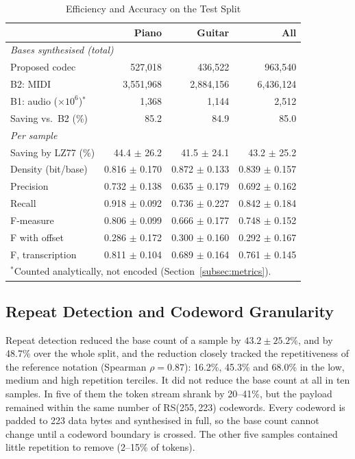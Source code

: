 \documentclass[conference]{IEEEtran}
\begin{document}
\begin{table}[htbp]
\caption{Efficiency and Accuracy on the Test Split}
\label{tab:results}
\centering
\footnotesize
\setlength{\tabcolsep}{3pt}
\begin{tabular}{lrrr}
\hline
 & \textbf{Piano} & \textbf{Guitar} & \textbf{All} \\
\hline
\multicolumn{4}{l}{\textit{Bases synthesised (total)}} \\
Proposed codec & 527,018 & 436,522 & 963,540 \\
B2: MIDI & 3,551,968 & 2,884,156 & 6,436,124 \\
B1: audio ($\times 10^{6}$)$^{*}$ & 1,368 & 1,144 & 2,512 \\
Saving vs.\ B2 (\%) & 85.2 & 84.9 & 85.0 \\
\multicolumn{4}{l}{\textit{Per sample}} \\
Saving by LZ77 (\%) & 44.4 $\pm$ 26.2 & 41.5 $\pm$ 24.1 & 43.2 $\pm$ 25.2 \\
Density (bit/base) & 0.816 $\pm$ 0.170 & 0.872 $\pm$ 0.133 & 0.839 $\pm$ 0.157 \\
Precision & 0.732 $\pm$ 0.138 & 0.635 $\pm$ 0.179 & 0.692 $\pm$ 0.162 \\
Recall & 0.918 $\pm$ 0.092 & 0.736 $\pm$ 0.227 & 0.842 $\pm$ 0.184 \\
F-measure & 0.806 $\pm$ 0.099 & 0.666 $\pm$ 0.177 & 0.748 $\pm$ 0.152 \\
F with offset & 0.286 $\pm$ 0.172 & 0.300 $\pm$ 0.160 & 0.292 $\pm$ 0.167 \\
F, transcription & 0.811 $\pm$ 0.104 & 0.689 $\pm$ 0.164 & 0.761 $\pm$ 0.145 \\
\hline
\multicolumn{4}{l}{$^{*}$Counted analytically, not encoded (Section~\ref{subsec:metrics}).} \\
\end{tabular}
\end{table}

\subsection{Repeat Detection and Codeword Granularity}

Repeat detection reduced the base count of a sample by $43.2 \pm 25.2$\%, and by 48.7\% over the whole split, and the reduction closely tracked the repetitiveness of the reference notation (Spearman $\rho = 0.87$): 16.2\%, 45.3\% and 68.0\% in the low, medium and high repetition terciles. It did not reduce the base count at all in ten samples. In five of them the token stream shrank by 20--41\%, but the payload remained within the same number of RS(255,\,223) codewords. Every codeword is padded to 223 data bytes and synthesised in full, so the base count cannot change until a codeword boundary is crossed. The other five samples contained little repetition to remove (2--15\% of tokens).
\end{document}
